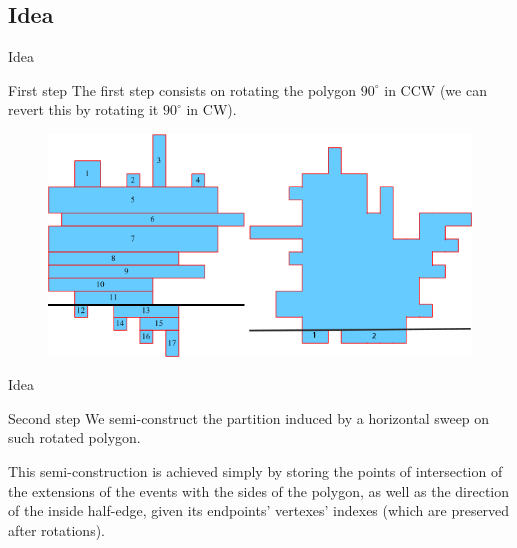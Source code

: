 \documentclass{beamer}
\begin{document}
\subsection{Idea}
\begin{frame}{Idea}
\begin{block}{First step}
The first step consists on rotating the polygon $90^{\circ}$ in CCW (we can revert this by rotating it $90^{\circ}$ in CW).

\pause

\begin{figure}
	\includegraphics[scale=0.3]{images/rotatedPoly}
\end{figure}

	
\end{block}
\end{frame}

\begin{frame}{Idea}
\begin{block}{Second step}
	We semi-construct the partition induced by a horizontal sweep on such rotated polygon.
	
	\pause
	
	This semi-construction is achieved simply by storing the points of intersection of the extensions of the events with the sides of the polygon, as well as the direction of the inside half-edge, given its endpoints' vertexes' indexes (which are preserved after rotations).
\end{block}
\end{frame}
\end{document}
